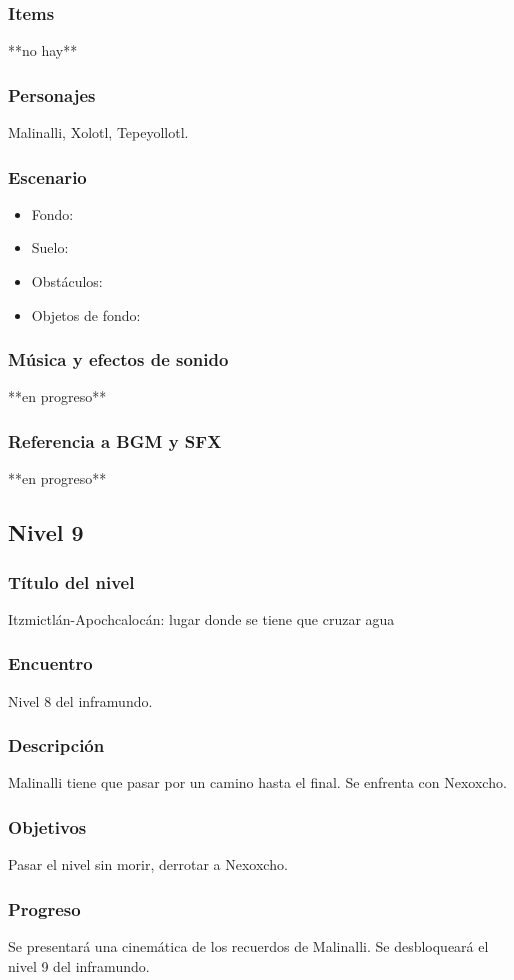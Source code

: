 \documentclass[11pt,letterpaper]{article}
\begin{document}
	\subsubsection{Items}
	**no hay**
	\subsubsection{Personajes}
	Malinalli, Xolotl, Tepeyollotl.
	\subsubsection{Escenario}
\begin{itemize} 
	\item Fondo:
	\item Suelo:
	\item Obstáculos:
	\item Objetos de fondo:
\end{itemize}	
	\subsubsection{Música y efectos de sonido}
	**en progreso**
	\subsubsection{Referencia a BGM y SFX}
	**en progreso**
	
		\subsection{Nivel 9}
	\subsubsection{Título del nivel}
	Itzmictlán-Apochcalocán: lugar donde se tiene que cruzar agua
	\subsubsection{Encuentro}
	Nivel 8 del inframundo.
	\subsubsection{Descripción}
	Malinalli tiene que pasar por un camino hasta el final. Se enfrenta con Nexoxcho.
	\subsubsection{Objetivos}
	Pasar el nivel  sin morir, derrotar a Nexoxcho.
	\subsubsection{Progreso}
	Se presentará una cinemática de los recuerdos de Malinalli. Se desbloqueará el nivel 9 del inframundo. 
\end{document}
